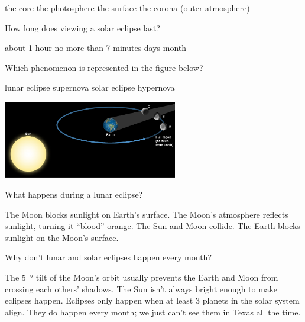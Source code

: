 \documentclass[addpoints]{exam}
\begin{document}
\begin{questions}
\begin{choices}
    \choice the core
    \choice the photosphere
    \choice the surface
    \correctchoice the corona (outer atmosphere)
\end{choices}

\question
How long does viewing a solar eclipse last?

\begin{choices}
    \choice about 1 hour
    \correctchoice no more than 7 minutes
     days
     month
\end{choices}





\question
Which phenomenon is represented in the figure below?
\vspace{1em}

\begin{minipage}{0.45\textwidth}
    \centering
    \begin{choices}
    \correctchoice lunar eclipse
    \choice supernova
    \choice solar eclipse
    \choice hypernova
    \end{choices}
\end{minipage}%
\begin{minipage}{0.5\textwidth}
    \centering
    \includegraphics[width=3in]{Figures/Figure4.24.jpg}
\end{minipage}

\question
What happens during a lunar eclipse?

\begin{choices}
    \choice The Moon blocks sunlight on Earth's surface.
    \choice The Moon's atmosphere reflects sunlight, turning it ``blood'' orange.
    \choice The Sun and Moon collide.
    \correctchoice The Earth blocks sunlight on the Moon's surface.
\end{choices}

\question
Why don't lunar and solar eclipses happen every month?

\begin{choices}
    \correctchoice The \SI{5}{\degree} tilt of the Moon's orbit usually prevents the Earth and Moon from crossing each others' shadows.
    \choice The Sun isn't always bright enough to make eclipses happen.
    \choice Eclipses only happen when at least 3 planets in the solar system align.
    \choice They do happen every month; we just can't see them in Texas all the time.
\end{choices}


\end{questions}
\end{document}
